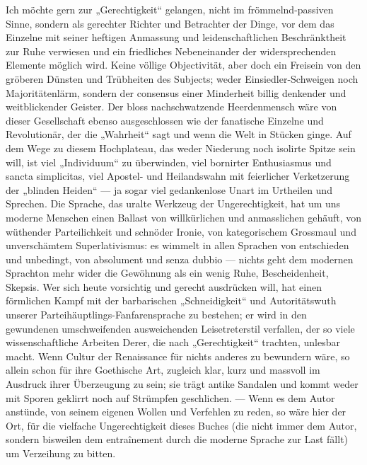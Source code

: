 Ich möchte gern zur „Gerechtigkeit“ gelangen, nicht im frömmelnd-passiven Sinne, sondern als gerechter Richter und Betrachter der Dinge, vor dem das Einzelne mit seiner heftigen Anmassung und leidenschaftlichen Beschränktheit zur Ruhe verwiesen und ein friedliches Nebeneinander der widersprechenden Elemente möglich wird. Keine völlige Objectivität, aber doch ein Freisein von den gröberen Dünsten und Trübheiten des Subjects; weder Einsiedler-Schweigen noch Majoritätenlärm, sondern der consensus einer Minderheit billig denkender und weitblickender Geister. Der bloss nachschwatzende Heerdenmensch wäre von dieser Gesellschaft ebenso ausgeschlossen wie der fanatische Einzelne und Revolutionär, der die „Wahrheit“ sagt und wenn die Welt in Stücken ginge. Auf dem Wege zu diesem Hochplateau, das weder Niederung noch isolirte Spitze sein will, ist viel „Individuum“ zu überwinden, viel bornirter Enthusiasmus und sancta simplicitas, viel Apostel- und Heilandswahn mit feierlicher Verketzerung der „blinden Heiden“ — ja sogar viel gedankenlose Unart im Urtheilen und Sprechen. Die Sprache, das uralte Werkzeug der Ungerechtigkeit, hat um uns moderne Menschen einen Ballast von willkürlichen und anmasslichen  gehäuft, von wüthender Parteilichkeit und schnöder Ironie, von kategorischem Grossmaul und unverschämtem Superlativismus: es wimmelt in allen Sprachen von entschieden und unbedingt, von absolument und senza dubbio — nichts geht dem modernen Sprachton mehr wider die Gewöhnung als ein wenig Ruhe, Bescheidenheit, Skepsis. Wer sich heute vorsichtig und gerecht ausdrücken will, hat einen förmlichen Kampf mit der barbarischen „Schneidigkeit“ und Autoritätswuth unserer Parteihäuptlings-Fanfarensprache zu bestehen; er wird in den gewundenen umschweifenden ausweichenden Leisetreterstil verfallen, der so viele wissenschaftliche Arbeiten Derer, die nach „Gerechtigkeit“ trachten, unlesbar macht. Wenn  Cultur der Renaissance für nichts anderes zu bewundern wäre, so allein schon für ihre Goethische Art, zugleich klar, kurz und massvoll im Ausdruck ihrer Überzeugung zu sein; sie trägt antike Sandalen und kommt weder mit Sporen geklirrt noch auf Strümpfen geschlichen. — Wenn es dem Autor anstünde, von seinem eigenen Wollen und Verfehlen zu reden, so wäre hier der Ort, für die vielfache Ungerechtigkeit dieses Buches (die nicht immer dem Autor, sondern bisweilen dem entraînement durch die moderne Sprache zur Last fällt) um Verzeihung zu bitten.
\par

